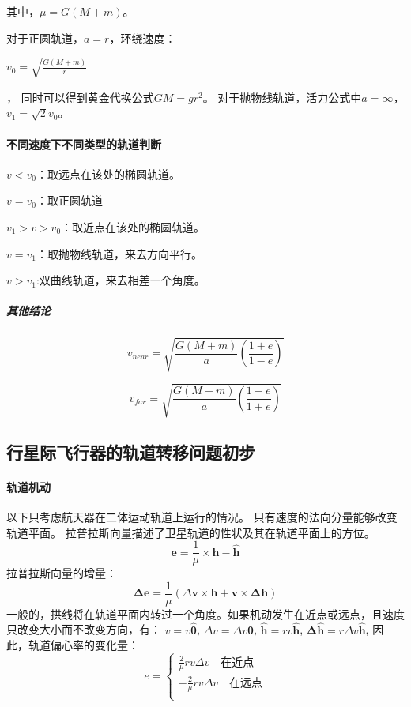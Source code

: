 其中，$\mu = G(M+m)$。

对于正圆轨道，$a = r$，环绕速度：

\begin{large}
	$v_{0} =\sqrt{\frac{G(M+m)}{r}}$ 
\end{large}，
同时可以得到黄金代换公式$GM=gr^2$。
对于抛物线轨道，活力公式中$a = \infty$，$v_{1}=\sqrt{2}v_{0}$。
\paragraph{不同速度下不同类型的轨道判断}
$v < v_{0}$：取远点在该处的椭圆轨道。

$v = v_{0}$：取正圆轨道

$v_{1}>v>v_{0}$：取近点在该处的椭圆轨道。

$v= v_{1}$：取抛物线轨道，来去方向平行。

$v>v_{1}$:双曲线轨道，来去相差一个角度。
\subparagraph{其他结论}
\begin{equation}
	v_{near} =\sqrt{\frac{G(M+m)}{a}\left(\frac{1+e}{1-e}\right)}
\end{equation}

\begin{equation}
	v_{far} = \sqrt{\frac{G(M+m)}{a}\left(\frac{1-e}{1+e}\right)}
\end{equation}


\subsection{行星际飞行器的轨道转移问题初步}
\paragraph{轨道机动}以下只考虑航天器在二体运动轨道上运行的情况。
只有速度的法向分量能够改变轨道平面。
拉普拉斯向量描述了卫星轨道的性状及其在轨道平面上的方位。
\begin{equation}
	\boldsymbol{e}=\frac{1}{\mu}\times \boldsymbol{h}-\boldsymbol{\hat{h}}
\end{equation}
拉普拉斯向量的增量：
\begin{equation}
	\boldsymbol{\Delta e}=\frac{1}{\mu}(\Delta \boldsymbol{v}\times \boldsymbol{h}+\boldsymbol{v}\times \boldsymbol{\Delta h})
\end{equation}
一般的，拱线将在轨道平面内转过一个角度。如果机动发生在近点或远点，且速度只改变大小而不改变方向，有：
$v=v\boldsymbol{\hat{\theta}}$,
$\Delta v=\Delta v\boldsymbol{\hat{\theta}}$,
$\boldsymbol{\hat{h}}=rv\boldsymbol{\hat{h}}$,
$\boldsymbol{\Delta\hat{h}}=r\Delta v\boldsymbol{\hat{h}}$,
因此，轨道偏心率的变化量：
\begin{equation}
	e=\left\{
	\begin{aligned}
		\frac{2}{\mu}rv\Delta v \quad \mbox{在近点}\\
		-\frac{2}{\mu}rv\Delta v \quad \mbox{在远点}\\
	\end{aligned}
	\right
	.
\end{equation}
